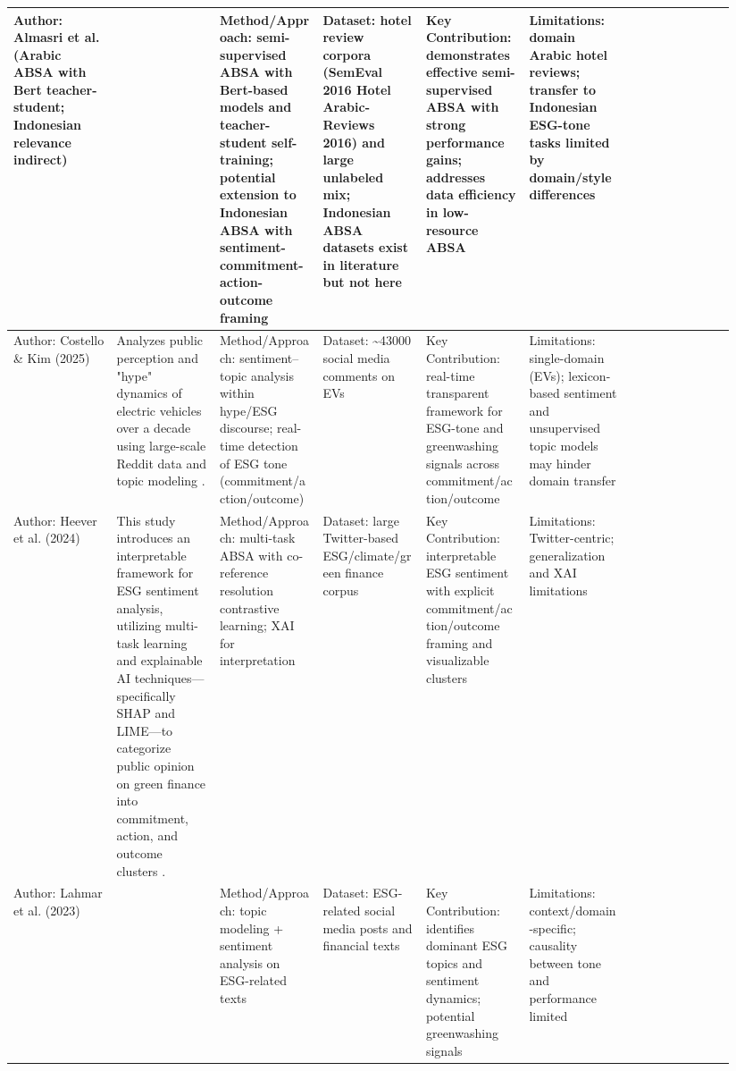 \documentclass{article}
\begin{document}
\begin{landscape}
\begin{longtable}{p{0.134\linewidth} p{0.134\linewidth} p{0.134\linewidth} p{0.134\linewidth} p{0.134\linewidth} p{0.134\linewidth} p{0.134\linewidth}}
Author: Almasri et al. (Arabic ABSA with Bert teacher-student; Indonesian relevance indirect) & ~ & Method/Approach: semi-supervised ABSA with Bert-based models and teacher-student self-training; potential extension to Indonesian ABSA with sentiment-commitment-action-outcome framing & Dataset: hotel review corpora (SemEval 2016 Hotel Arabic-Reviews 2016) and large unlabeled mix; Indonesian ABSA datasets exist in literature but not here & Key Contribution: demonstrates effective semi-supervised ABSA with strong performance gains; addresses data efficiency in low-resource ABSA & Limitations: domain Arabic hotel reviews; transfer to Indonesian ESG-tone tasks limited by domain/style differences & ~ \\ \hline
Author: Costello \& Kim (2025) & Analyzes public perception and "hype" dynamics of electric vehicles over a decade using large-scale Reddit data and topic modeling  \parencite{tao_ruan_824a9480}. & Method/Approach: sentiment–topic analysis within hype/ESG discourse; real-time detection of ESG tone (commitment/action/outcome) & Dataset: \textasciitilde{}43000 social media comments on EVs & Key Contribution: real-time transparent framework for ESG-tone and greenwashing signals across commitment/action/outcome & Limitations: single-domain (EVs); lexicon-based sentiment and unsupervised topic models may hinder domain transfer & ~ \\ \hline
Author: Heever et al. (2024) & This study introduces an interpretable framework for ESG sentiment analysis, utilizing multi-task learning and explainable AI techniques—specifically SHAP and LIME—to categorize public opinion on green finance into commitment, action, and outcome clusters  \parencite{wihan_van_der_heever_44c76c99}. & Method/Approach: multi-task ABSA with co-reference resolution contrastive learning; XAI for interpretation & Dataset: large Twitter-based ESG/climate/green finance corpus & Key Contribution: interpretable ESG sentiment with explicit commitment/action/outcome framing and visualizable clusters & Limitations: Twitter-centric; generalization and XAI limitations & ~ \\ \hline
Author: Lahmar et al. (2023) & ~ & Method/Approach: topic modeling + sentiment analysis on ESG-related texts & Dataset: ESG-related social media posts and financial texts & Key Contribution: identifies dominant ESG topics and sentiment dynamics; potential greenwashing signals & Limitations: context/domain-specific; causality between tone and performance limited & ~ \\ \hline

\end{longtable}
\end{landscape}
\end{document}
